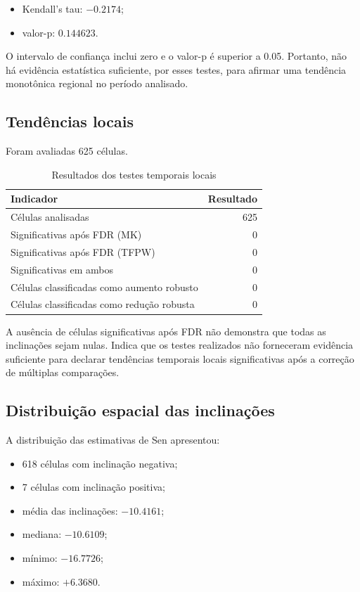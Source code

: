 \documentclass[12pt,a4paper]{article}
\begin{document}
\begin{itemize}
    \item Kendall's tau: $-0.2174$;
    \item valor-p: $0.144623$.
\end{itemize}

O intervalo de confiança inclui zero e o valor-p
é superior a 0.05. Portanto, não há evidência
estatística suficiente, por esses testes, para
afirmar uma tendência monotônica regional no
período analisado.

\subsection{Tendências locais}

Foram avaliadas 625 células.

\begin{table}[H]
\centering
\caption{Resultados dos testes temporais locais}
\begin{tabular}{lr}
\toprule
Indicador & Resultado \\
\midrule
Células analisadas & 625 \\
Significativas após FDR (MK) & 0 \\
Significativas após FDR (TFPW) & 0 \\
Significativas em ambos & 0 \\
Células classificadas como aumento robusto & 0 \\
Células classificadas como redução robusta & 0 \\
\bottomrule
\end{tabular}
\end{table}

A ausência de células significativas após FDR não
demonstra que todas as inclinações sejam nulas.
Indica que os testes realizados não forneceram
evidência suficiente para declarar tendências
temporais locais significativas após a correção
de múltiplas comparações.

\subsection{Distribuição espacial das inclinações}

A distribuição das estimativas de Sen apresentou:

\begin{itemize}
    \item 618 células com inclinação negativa;
    \item 7 células com inclinação positiva;
    \item média das inclinações: $-10.4161$;
    \item mediana: $-10.6109$;
    \item mínimo: $-16.7726$;
    \item máximo: $+6.3680$.
\end{itemize}
\end{document}
